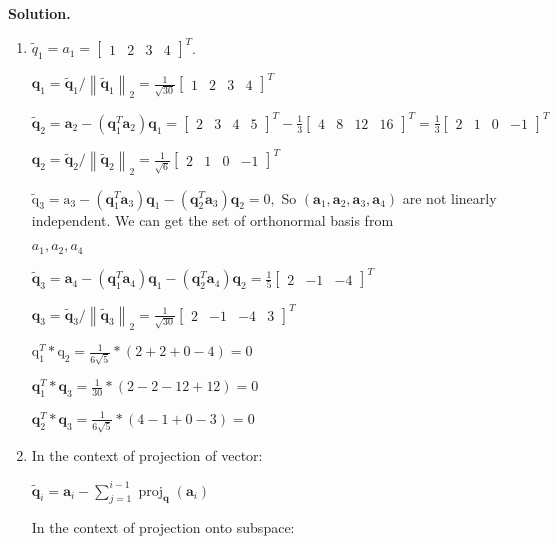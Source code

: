 \documentclass[english,onecolumn]{IEEEtran}
\begin{document}
\noindent
\textbf{Solution.}
\begin{enumerate}
	\item 
	$\tilde{q}_{1}=a_{1}=\left[\begin{array}{llll}1 & 2 & 3 & 4\end{array}\right]^{T}$.
	
	$\mathbf{q}_{1}=\tilde{\mathbf{q}}_{1} /\left\|\tilde{\mathbf{q}}_{1}\right\|_{2}=\frac{1}{\sqrt{30}}\left[\begin{array}{llll}1 & 2 & 3 & 4\end{array}\right]^{T}$
	
	$\tilde{\mathbf{q}}_{2}=\mathbf{a}_{2}-\left(\mathbf{q}_{1}^{T} \mathbf{a}_{2}\right) \mathbf{q}_{1}=\left[\begin{array}{llll}2 & 3 & 4 & 5\end{array}\right]^{T}-\frac{1}{3}\left[\begin{array}{llll}4 & 8 & 12 & 16\end{array}\right]^{T}=\frac{1}{3}\left[\begin{array}{llll}2 & 1 & 0 & -1\end{array}\right]^{T}$
	
	$\mathbf{q}_{2}=\tilde{\mathbf{q}}_{2} /\left\|\tilde{\mathbf{q}}_{2}\right\|_{2}=\frac{1}{\sqrt{6}}\left[\begin{array}{llll}2 & 1 & 0 & -1\end{array}\right]^{T}$
	
	$\tilde{\mathrm{q}}_{3}=\mathrm{a}_{3}-\left(\mathbf{q}_{1}^{T} \mathbf{a}_{3}\right) \mathbf{q}_{1}-\left(\mathbf{q}_{2}^{T} \mathbf{a}_{3}\right) \mathbf{q}_{2}=0,$ So $\left(\mathbf{a}_{1}, \mathbf{a}_{2}, \mathbf{a}_{3}, \mathbf{a}_{4}\right)$ are not linearly independent. We can get the set
	of orthonormal basis from 
	
	$a_{1}, a_{2}, a_{4}$
	
	$\tilde{\mathbf{q}}_{3}=\mathbf{a}_{4}-\left(\mathbf{q}_{1}^{T} \mathbf{a}_{4}\right) \mathbf{q}_{1}-\left(\mathbf{q}_{2}^{T} \mathbf{a}_{4}\right) \mathbf{q}_{2}=\frac{1}{5}\left[\begin{array}{llll}2 & -1 & -4\end{array}\right]^{T}$
	
	$\mathbf{q}_{3}=\tilde{\mathbf{q}}_{3} /\left\|\tilde{\mathbf{q}}_{3}\right\|_{2}=\frac{1}{\sqrt{30}}\left[\begin{array}{llll}2 & -1 & -4 & 3\end{array}\right]^{T}$
	
	$\mathrm{q}_{1}^{T} * \mathrm{q}_{2}=\frac{1}{6 \sqrt{5}} *(2+2+0-4)=0$
	
	$\mathbf{q}_{1}^{T} * \mathbf{q}_{3}=\frac{1}{30} *(2-2-12+12)=0$
	
	$\mathbf{q}_{2}^{T} * \mathbf{q}_{3}=\frac{1}{6 \sqrt{5}} *(4-1+0-3)=0$
	\item In the context of projection of vector:
	
	$\tilde{\mathbf{q}}_{i}=\mathbf{a}_{i}-\sum_{j=1}^{i-1} \operatorname{proj}_{\mathbf{q}}\left(\mathbf{a}_{i}\right)$
	
	In the context of projection onto subspace:
\end{enumerate} 
\end{document}
